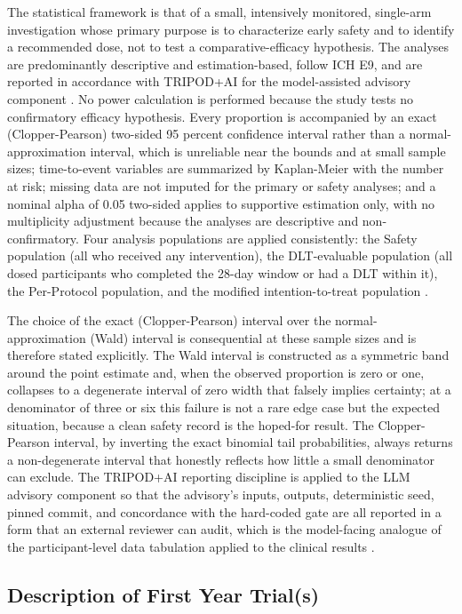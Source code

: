 The statistical framework is that of a small, intensively monitored, single-arm
investigation whose primary purpose is to characterize early safety and to identify
a recommended dose, not to test a comparative-efficacy hypothesis. The analyses are
predominantly descriptive and estimation-based, follow ICH E9, and are reported in
accordance with TRIPOD+AI for the model-assisted advisory component
\cite{ichpaistduni}. No power calculation is performed because the study tests no
confirmatory efficacy hypothesis. Every proportion is accompanied by an exact
(Clopper-Pearson) two-sided 95 percent confidence interval rather than a
normal-approximation interval, which is unreliable near the bounds and at small
sample sizes; time-to-event variables are summarized by Kaplan-Meier with the number
at risk; missing data are not imputed for the primary or safety analyses; and a
nominal alpha of 0.05 two-sided applies to supportive estimation only, with no
multiplicity adjustment because the analyses are descriptive and non-confirmatory.
Four analysis populations are applied consistently: the Safety population (all who
received any intervention), the DLT-evaluable population (all dosed participants who
completed the 28-day window or had a DLT within it), the Per-Protocol population,
and the modified intention-to-treat population \cite{ichpaistduni,phase1guidance}.

The choice of the exact (Clopper-Pearson) interval over the normal-approximation
(Wald) interval is consequential at these sample sizes and is therefore stated
explicitly. The Wald interval is constructed as a symmetric band around the point
estimate and, when the observed proportion is zero or one, collapses to a degenerate
interval of zero width that falsely implies certainty; at a denominator of three or
six this failure is not a rare edge case but the expected situation, because a clean
safety record is the hoped-for result. The Clopper-Pearson interval, by inverting the
exact binomial tail probabilities, always returns a non-degenerate interval that
honestly reflects how little a small denominator can exclude. The TRIPOD+AI reporting
discipline is applied to the LLM advisory component so that the advisory's inputs,
outputs, deterministic seed, pinned commit, and concordance with the hard-coded gate
are all reported in a form that an external reviewer can audit, which is the
model-facing analogue of the participant-level data tabulation applied to the
clinical results \cite{ichpaistduni,clintrustpai}.

\subsection{Description of First Year Trial(s)}

